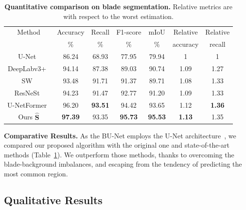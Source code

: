 \begin{table}[t!]
\centering
\caption{\textbf{Quantitative comparison on blade segmentation.} Relative metrics are with respect to the worst estimation.} 
\vspace{0cm}
\label{tab:seg-unet-compare}
\resizebox{8.5 cm}{!} {
\begin{tabular}{ccccccc}
\toprule
     \multicolumn{1}{c}{Method} & \multicolumn{1}{c}{Accuracy}  & \multicolumn{1}{c}{Recall} & \multicolumn{1}{c}{F1-score} & \multicolumn{1}{c}{mIoU} & Relative & Relative\\
    \multicolumn{1}{c}{} & {\%} & {\%}  & {\%}  & {\%} & accuracy & recall \\
    \midrule
   U-Net~\cite{unet} & 86.24 & 68.93 & 77.95 & 79.94 & 1 & 1\\ 
   DeepLabv3+~\cite{deeplabv3+}  & 94.14 & 87.38 & 89.03 & 90.74 & 1.09 & 1.27 \\ 
   SW~\cite{sw} & 93.48 & 91.71 & 91.37 & 89.71 & 1.08 & 1.33 \\ 
   ResNeSt~\cite{resnest} & 94.23 & 91.47 & 92.77 & 91.20 & 1.09 & 1.33 \\ 
   U-NetFormer~\cite{unetformer} & 96.20 & \textbf{93.51} & 94.42 & 93.65 & 1.12 & \textbf{1.36} \\ 
   Ours $\hat{\mathbf{S}}$ & \textbf{97.39} & 93.35 & \textbf{95.73} & \textbf{95.53} & \textbf{1.13} & 1.35 \\ 
\bottomrule
\end{tabular}}
\vspace{-0.5cm}
\end{table}



\textbf{Comparative Results.} As the BU-Net employs the U-Net architecture~\cite{unet}, we compared our proposed algorithm with the original one and state-of-the-art methods (Table~\ref{tab:seg-unet-compare}). We outperform those methods, thanks to overcoming the blade-background imbalances, and escaping from the tendency of predicting the most common region. 

\vspace{-0.3cm}
\subsection{Qualitative Results}
\vspace{-0.1cm}

